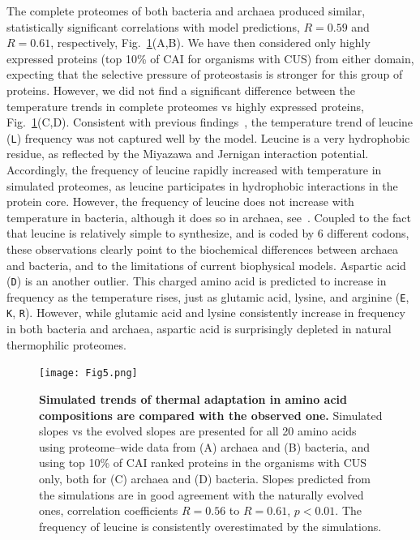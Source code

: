 \documentclass[10pt,letterpaper]{article}
\begin{document}
The complete proteomes of both bacteria and archaea produced similar, statistically significant correlations with model predictions, $R=0.59$ and $R=0.61$, respectively, Fig.~\ref{fig:fig5}(A,B). We have then considered only highly expressed proteins (top 10\% of CAI for organisms with CUS) from either domain, expecting that the selective pressure of proteostasis is stronger for this group of proteins. However, we did not find a significant difference between the temperature trends in complete proteomes vs highly expressed proteins, Fig.~\ref{fig:fig5}(C,D). Consistent with previous findings~\cite{Venev2015Massively}, the temperature trend of leucine (\texttt{L}) frequency was not captured well by the model. Leucine is a very hydrophobic residue, as reflected by the Miyazawa and Jernigan interaction potential. Accordingly, the frequency of leucine rapidly increased with temperature in simulated proteomes, as leucine participates in hydrophobic interactions in the protein core. However, the frequency of leucine does not increase with temperature in bacteria, although it does so in archaea, see~. Coupled to the fact that leucine is relatively simple to synthesize, and is coded by 6 different codons, these observations clearly point to the biochemical differences between archaea and bacteria, and to the limitations of current biophysical models. Aspartic acid (\texttt{D}) is an another outlier. This charged amino acid is predicted to increase in frequency as the temperature rises, just as glutamic acid, lysine, and arginine (\texttt{E}, \texttt{K}, \texttt{R}). However, while glutamic acid and lysine consistently increase in frequency in both bacteria and archaea, aspartic acid is surprisingly depleted in natural thermophilic proteomes.

\begin{figure}[h!]
\texttt{[image: Fig5.png]}
\caption{
{\bf Simulated trends of thermal adaptation in amino acid compositions are compared with the observed one.} Simulated slopes vs the evolved slopes are presented for all 20 amino acids using proteome--wide data from (A) archaea and (B) bacteria, and using top 10\% of CAI ranked proteins in the organisms with CUS only, both for (C) archaea and (D) bacteria. Slopes predicted from the simulations are in good agreement with the naturally evolved ones, correlation coefficients $R=0.56$ to $R=0.61$, $p<0.01$. The frequency of leucine is consistently overestimated by the simulations.
}
\label{fig:fig5}
\end{figure}
\end{document}
